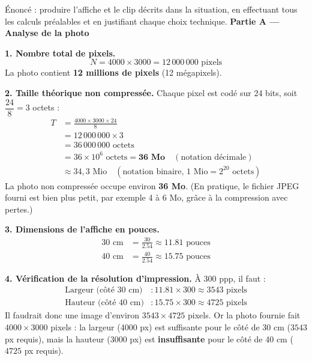 \documentclass[11pt]{article}
\begin{document}
\begin{exoresolu}
Énoncé : produire l'affiche et le clip décrits dans la situation, en effectuant tous les calculs préalables et en justifiant chaque choix technique.
\tcblower
\textbf{Partie A — Analyse de la photo}

\textbf{1. Nombre total de pixels.}
\[ N = 4000 \times 3000 = 12\,000\,000 \text{ pixels} \]
La photo contient \textbf{12 millions de pixels} (12 mégapixels).

\textbf{2. Taille théorique non compressée.} Chaque pixel est codé sur 24 bits, soit $\dfrac{24}{8} = 3$ octets :
\begin{align*}
T &= \frac{4000 \times 3000 \times 24}{8} \\
  &= 12\,000\,000 \times 3 \\
  &= 36\,000\,000 \text{ octets} \\
  &= 36 \times 10^{6} \text{ octets} = \textbf{36 Mo} \quad (\text{notation décimale}) \\
  &\approx 34,3 \text{ Mio} \quad (\text{notation binaire, } 1 \text{ Mio} = 2^{20} \text{ octets})
\end{align*}
La photo non compressée occupe environ \textbf{36 Mo}. (En pratique, le fichier JPEG fourni est bien plus petit, par exemple 4 à 6 Mo, grâce à la compression avec pertes.)

\textbf{3. Dimensions de l'affiche en pouces.}
\begin{align*}
30 \text{ cm} &= \frac{30}{\num{2,54}} \approx \num{11,81} \text{ pouces} \\
40 \text{ cm} &= \frac{40}{\num{2,54}} \approx \num{15,75} \text{ pouces}
\end{align*}

\textbf{4. Vérification de la résolution d'impression.} À 300 ppp, il faut :
\begin{align*}
\text{Largeur (côté 30 cm)} &: \num{11,81} \times 300 \approx 3543 \text{ pixels} \\
\text{Hauteur (côté 40 cm)} &: \num{15,75} \times 300 \approx 4725 \text{ pixels}
\end{align*}
Il faudrait donc une image d'environ $3543 \times 4725$ pixels. Or la photo fournie fait $4000 \times 3000$ pixels : la largeur (4000 px) est suffisante pour le côté de 30 cm ($3543$ px requis), mais la hauteur (3000 px) est \textbf{insuffisante} pour le côté de 40 cm ($4725$ px requis).


\end{exoresolu}
\end{document}

